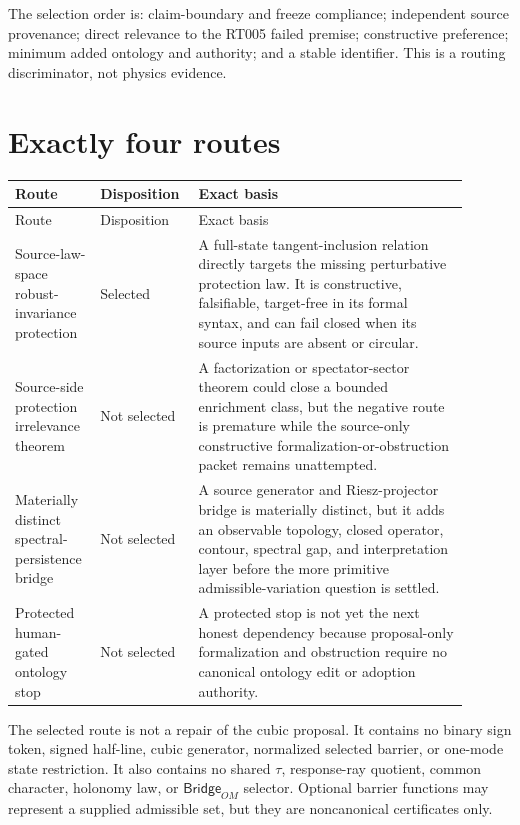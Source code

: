 \documentclass[11pt]{article}
\begin{document}
The selection order is: claim-boundary and freeze compliance; independent
source provenance; direct relevance to the RT005 failed premise;
constructive preference; minimum added ontology and authority; and a stable
identifier.  This is a routing discriminator, not physics evidence.

\section{Exactly four routes}

\begin{longtable}{P{0.16\linewidth}P{0.18\linewidth}P{0.56\linewidth}}
\toprule
Route & Disposition & Exact basis \\
\midrule
\endfirsthead
\toprule
Route & Disposition & Exact basis \\
\midrule
\endhead
Source-law-space robust-invariance protection & Selected & A full-state
tangent-inclusion relation directly targets the missing perturbative
protection law.  It is constructive, falsifiable, target-free in its formal
syntax, and can fail closed when its source inputs are absent or circular. \\
Source-side protection irrelevance theorem & Not selected & A factorization
or spectator-sector theorem could close a bounded enrichment class, but the
negative route is premature while the source-only constructive
formalization-or-obstruction packet remains unattempted. \\
Materially distinct spectral-persistence bridge & Not selected & A source
generator and Riesz-projector bridge is materially distinct, but it adds an
observable topology, closed operator, contour, spectral gap, and
interpretation layer before the more primitive admissible-variation question
is settled. \\
Protected human-gated ontology stop & Not selected & A protected stop is not
yet the next honest dependency because proposal-only formalization and
obstruction require no canonical ontology edit or adoption authority. \\
\bottomrule
\end{longtable}

The selected route is not a repair of the cubic proposal.  It contains no
binary sign token, signed half-line, cubic generator, normalized selected
barrier, or one-mode state restriction.  It also contains no shared
\(\tau\), response-ray quotient, common character, holonomy law, or
\(\mathsf{Bridge}_{OM}\) selector.  Optional barrier functions may represent
a supplied admissible set, but they are noncanonical certificates only.
\end{document}
